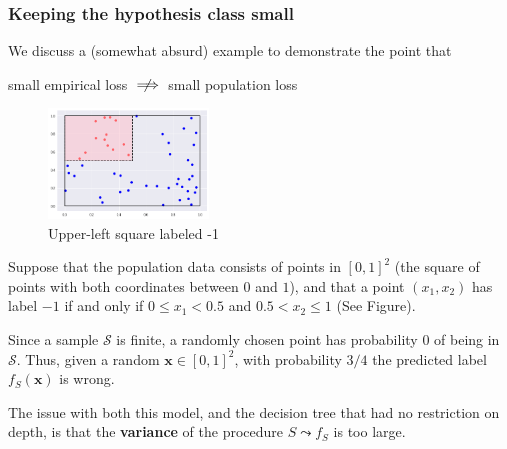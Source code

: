 \documentclass[smaller]{beamer}
\theoremstyle{example}
\newcommand{\x}{\textbf{x}}
\begin{document}
\begin{frame}
    \frametitle{Keeping the hypothesis class small}
We discuss a (somewhat absurd) example to demonstrate the point that 
\begin{center} small empirical loss $\centernot\implies$ small population loss\end{center}

\begin{figure}
    \begin{center}
        \includegraphics[width=0.38\textwidth]{../../Images/fourth_square-13v37.png}
    \end{center}
    \caption{Upper-left square labeled -1}
\end{figure}

Suppose that the population data consists of points in $[0,1]^2$ (the square of points with both coordinates between $0$ and $1$), and that a point $(x_1,x_2)$ has label $-1$ if and only if $0\le x_1 < 0.5$ and $0.5< x_2 \le 1$ (See Figure).
\vspace*{12pt}

Since a sample $\mathcal S$ is finite, a randomly chosen point has probability $0$ of being in $\mathcal S$. Thus, given a random $\x\in[0,1]^2$, with probability $3/4$ the predicted label $f_S(\x)$ is wrong.

The issue with both this model, and the decision tree that had no restriction on depth, is that the \textbf{variance} of the procedure $S \leadsto f_S$ is too large.
\end{frame}
\end{document}

